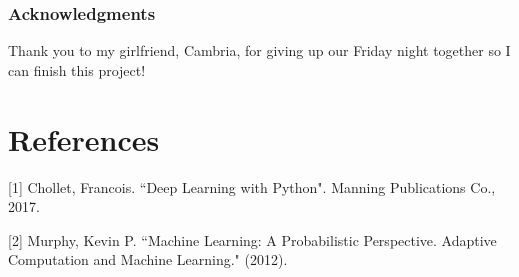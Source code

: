 \documentclass{article}
\begin{document}
\subsubsection*{Acknowledgments}
Thank you to my girlfriend, Cambria, for giving up our Friday night together so I can finish this project!

\section*{References}

\small
[1] Chollet, Francois. ``Deep Learning with Python". Manning Publications Co., 2017.

[2] Murphy, Kevin P. ``Machine Learning: A Probabilistic Perspective. Adaptive Computation and Machine Learning." (2012).
\end{document}
